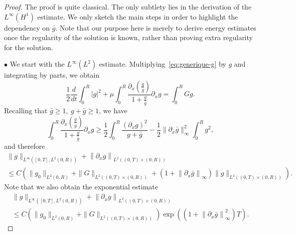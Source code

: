 \documentclass[AHL,Unicode,longabstracts,published]{cedram}
\newcommand{\p}{\partial}
\begin{document}
\begin{proof}
The proof is quite classical. The only subtlety lies in the derivation of the $L^\infty(H^1)$ estimate. We only sketch the main steps in order to highlight the dependency on $\bar g$. Note that our purpose here is merely to derive energy estimates once the regularity of the solution is known, rather than proving extra regularity for the solution.


$\bullet$ We start with the $L^\infty(L^2)$ estimate. Multiplying~\eqref{eq:generique-g} by $g$ and integrating by parts, we obtain
\[
\frac{1}{2}\frac{d}{dt}\int_0^R|g|^2 + \mu \int_0^R \frac{\p_x(\frac{g}{\bar g})}{1 + \frac{g}{\bar g}}\p_x g = \int_0^R G g.
\]
Recalling that $\bar g\geq 1,\ g+ \bar g\geq 1$, we have
\[
\int_0^R \frac{\p_x(\frac{g}{\bar g}) }{1 + \frac{g}{\bar g}}\p_x g\geq \frac{1}{2}\int_0^R\frac{(\p_x g)^2}{g+ \bar g} - \frac{1}{2} \|\p_x \bar g\|_\infty^2 \int_0^R g^2,
\]
and therefore
\begin{multline}\label{est:g-generique-L^2}
\|g\|_{L^\infty\left([0,T], L^2(0,R)\right)} + \left\|\p_x g\right\|_{L^2\left((0,T)\times (0,R)\right)}\\
\leq C \left(\|g_0\|_{L^2(0,R)} + \| G\|_{L^2\left((0,T)\times (0,R)\right)} + \left(1+ \left\|\p_x \bar g\right\|_\infty\right) \|g\|_{L^2\left((0,T)\times (0,R)\right)}\right).
\end{multline}
Note that we also obtain the exponential estimate
\begin{multline*}
\|g\|_{L^\infty\left([0,T], L^2(0,R)\right)} + \left\|\p_x g\right\|_{L^2\left((0,T)\times (0,R)\right)}\\
\leq C \left(\|g_0\|_{L^2(0,R)} + \| G\|_{L^2\left((0,T)\times (0,R)\right)}\right)\exp\left(\left(1+ \left\|\p_x \bar g\right\|_\infty^2\right)T\right).
\end{multline*}




\end{proof}
\end{document}
